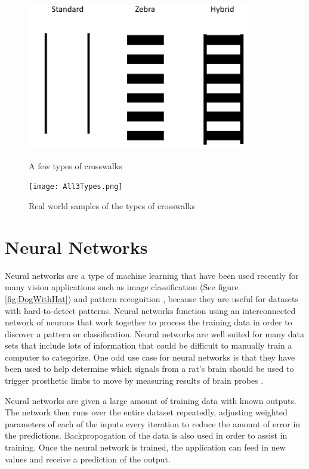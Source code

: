 \documentclass[12pt]{ucthesis}
\newcommand{\captionfonts}{\small\bf\ssp}
\begin{document}
\begin{figure}[t]
\begin{center}
\includegraphics[width=10cm]{TypesOfXwalks.png}
\captionfonts
\caption[Three Types of Crosswalks]{A few types of crosswalks}
\label{fig:TypesOfXwalksFig}
\end{center}
\end{figure}

\begin{figure}[t]
\begin{center}
\texttt{[image: All3Types.png]}
\captionfonts
\caption[Real Photos of Crosswalk Types]{Real world samples of the types of crosswalks}
\label{fig:TypesOfXwalksRealFig}
\end{center}
\end{figure}

\section{Neural Networks}
Neural networks are a type of machine learning that have been used recently for many vision applications such as image classification (See figure \ref{fig:DogWithHat}) and pattern recognition \cite{christianszegedy2014}, because they are useful for datasets with hard-to-detect patterns. Neural networks function using an interconnected network of neurons that work together to process the training data in order to discover a pattern or classification. Neural networks are well suited for many data sets that include lots of information that could be difficult to manually train a computer to categorize. One odd use case for neural networks is that they have been used to help determine which signals from a rat's brain should be used to trigger prosthetic limbs to move by measuring results of brain probes \cite{ratNeural}.

Neural networks are given a large amount of training data with known outputs. The network then runs over the entire dataset repeatedly, adjusting weighted parameters of each of the inputs every iteration to reduce the amount of error in the predictions. Backpropogation of the data is also used in order to assist in training. Once the neural network is trained, the application can feed in new values and receive a prediction of the output.
\end{document}
